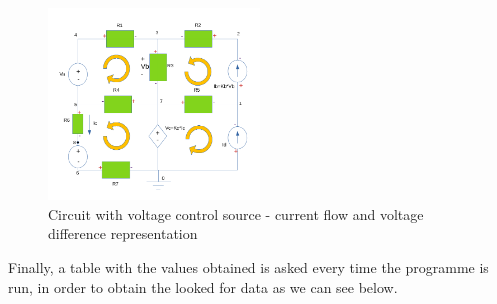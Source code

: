 \begin{figure}[h]
\includegraphics[width=0.5\textwidth]{Esquema_salito.PNG}
\centering
\caption{Circuit with voltage control source - current flow and voltage difference representation}
\label{fig:figure5}
\end{figure}

\par \noindent Finally, a table with the values obtained is asked every time the programme is run, in order to obtain the looked for data as we can see below. 
\vspace{5mm}
\begin{table}
\centering
\begin{tabularx}{0.8\textwidth} {
  | >{\raggedright\arraybackslash}X
  | >{\raggedleft\arraybackslash}X | }
 \hline

\end{tabularx}
\end{table}




